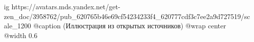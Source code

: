  
 
 
 
 

\ifcmt
  ig https://avatars.mds.yandex.net/get-zen_doc/3958762/pub_620765b46e69cf54234233f4_620777cdf3c7ee2a9d727519/scale_1200
  @caption (Иллюстрация из открытых источников)
  @wrap center
  @width 0.6
\fi
